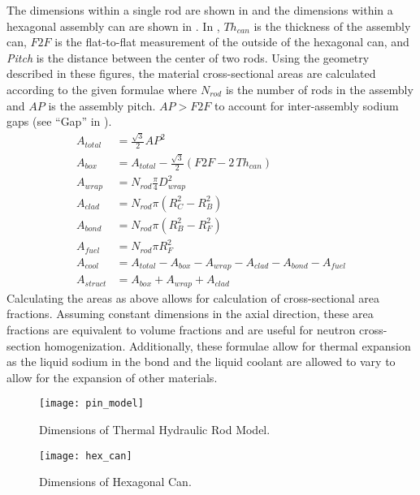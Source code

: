   The dimensions within a single rod are shown in  and the
  dimensions within a hexagonal assembly can are shown in . In
  , $T\!h_{can}$ is the thickness of the assembly can,
  $F\!2\!F$ is the flat-to-flat measurement of the outside of the hexagonal can,
  and \textit{Pitch} is the distance between the center of two rods.  Using the
  geometry described in these figures, the material cross-sectional areas are
  calculated according to the given formulae where $N_{rod}$ is the number of
  rods in the assembly and $A\!P$ is the assembly pitch. $A\!P > F\!2\!F$ to
  account for inter-assembly sodium gaps (see ``Gap'' in ).
  \begin{align}
    \label{eq:afrac_first}
    A_{total} &= \frac{\sqrt{3}}{2} A\!P^2 \\
    A_{box} &= A_{total} - 
      \frac{\sqrt{3}}{2} \left(  F\!2\!F - 2 \, T\!h_{can} \right) \\
    A_{wrap} &= N_{rod} \frac{\pi}{4} D_{wrap}^2 \\
    A_{clad} &= N_{rod} \pi (R_C^2 - R_B^2) \\
    A_{bond} &= N_{rod} \pi (R_B^2 - R_F^2) \\
    A_{fuel} &= N_{rod} \pi R_F^2 \\
    A_{cool} &= A_{total} - A_{box} - A_{wrap} - A_{clad} - A_{bond} -
      A_{fuel}\\
    \label{eq:afrac_last}
    A_{struct} &= A_{box} + A_{wrap} + A_{clad}
  \end{align}
  Calculating the areas as above allows for calculation of cross-sectional area
  fractions. Assuming constant dimensions in the axial direction, these area
  fractions are equivalent to volume fractions and are useful for neutron
  cross-section homogenization. Additionally, these formulae allow for thermal
  expansion as the liquid sodium in the bond and the liquid coolant are allowed
  to vary to allow for the expansion of other materials.

  \begin{figure}
    \centering
    \texttt{[image: pin\_model]}
    \caption{Dimensions of Thermal Hydraulic Rod Model.}
    \label{fig:pin_model}
  \end{figure}

  \begin{figure}
    \centering
    \texttt{[image: hex\_can]}
    \caption{Dimensions of Hexagonal Can.}
    \label{fig:hex_can}
  \end{figure}


